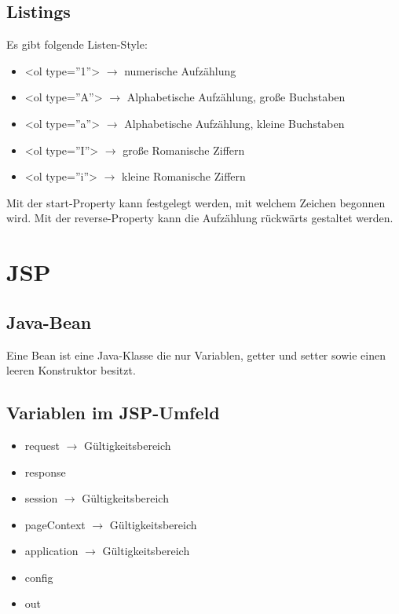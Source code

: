 \documentclass[11pt]{article}
\begin{document}
		\subsection{Listings}
		
			Es gibt folgende Listen-Style:
			
			\begin{itemize}
				\item <ol type=''1''> $\rightarrow$ numerische Aufzählung
				\item <ol type=''A''> $\rightarrow$ Alphabetische Aufzählung, große Buchstaben
				\item <ol type=''a''> $\rightarrow$ Alphabetische Aufzählung, kleine Buchstaben
				\item <ol type=''I''> $\rightarrow$ große Romanische Ziffern
				\item <ol type=''i''> $\rightarrow$ kleine Romanische Ziffern
			\end{itemize}
			
			Mit der start-Property kann festgelegt werden, mit welchem Zeichen begonnen wird. \newline
			Mit der reverse-Property kann die Aufzählung rückwärts gestaltet werden.
			
	\section{JSP}
	
		\subsection{Java-Bean}
			Eine Bean ist eine Java-Klasse die nur Variablen, getter und setter sowie einen leeren Konstruktor besitzt.
			
		\subsection{Variablen im JSP-Umfeld}
			\begin{itemize}
				\item request $\rightarrow$ Gültigkeitsbereich
				\item response
				\item session $\rightarrow$ Gültigkeitsbereich
				\item pageContext $\rightarrow$ Gültigkeitsbereich
				\item application $\rightarrow$ Gültigkeitsbereich
				\item config
				\item out
			\end{itemize}
		
\end{document}
